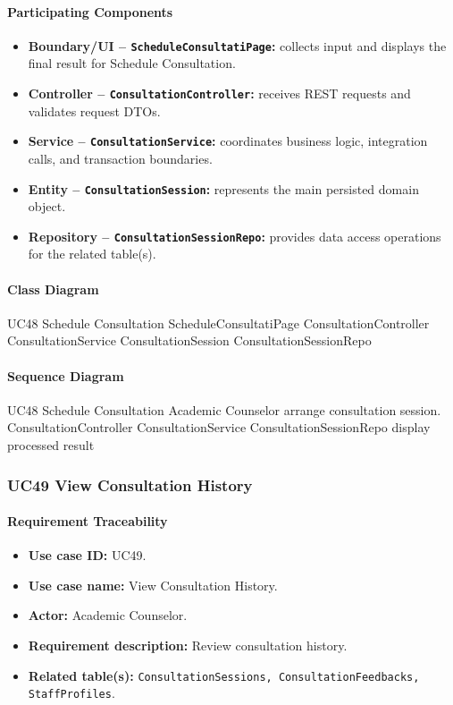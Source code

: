 \paragraph{Participating Components}

\begin{itemize}
    \item \textbf{Boundary/UI -- \texttt{ScheduleConsultatiPage}:} collects input and displays the final result for Schedule Consultation.
    \item \textbf{Controller -- \texttt{ConsultationController}:} receives REST requests and validates request DTOs.
    \item \textbf{Service -- \texttt{ConsultationService}:} coordinates business logic, integration calls, and transaction boundaries.
    \item \textbf{Entity -- \texttt{ConsultationSession}:} represents the main persisted domain object.
    \item \textbf{Repository -- \texttt{ConsultationSessionRepo}:} provides data access operations for the related table(s).
\end{itemize}

\paragraph{Class Diagram}

\ClassDiagram
{UC48 Schedule Consultation}
{ScheduleConsultatiPage}
{ConsultationController}
{ConsultationService}
{ConsultationSession}
{ConsultationSessionRepo}

\paragraph{Sequence Diagram}

\SequenceDiagram
{UC48 Schedule Consultation}
{Academic Counselor}
{arrange consultation session.}
{ConsultationController}
{ConsultationService}
{ConsultationSessionRepo}
{display processed result}

\subsubsection{UC49 View Consultation History}

\paragraph{Requirement Traceability}

\begin{itemize}
    \item \textbf{Use case ID:} UC49.
    \item \textbf{Use case name:} View Consultation History.
    \item \textbf{Actor:} Academic Counselor.
    \item \textbf{Requirement description:} Review consultation history.
    \item \textbf{Related table(s):} \texttt{ConsultationSessions, ConsultationFeedbacks, StaffProfiles}.
\end{itemize}

